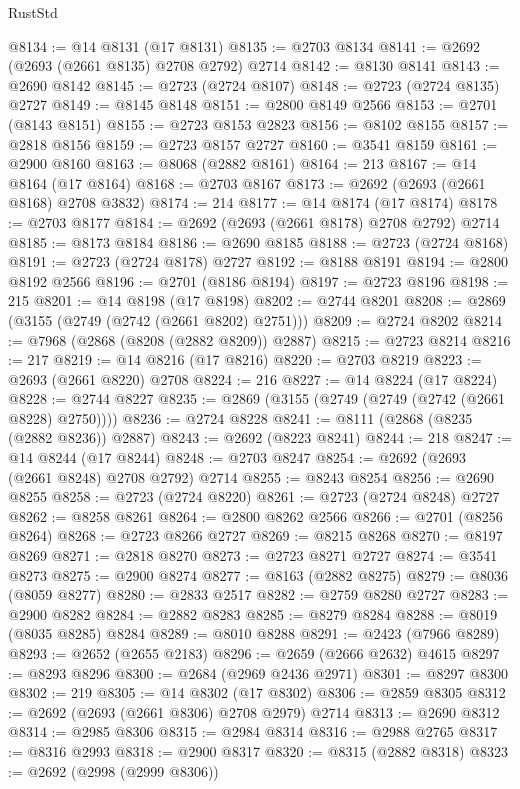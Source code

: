 \begin{lexlean}{RustStd}
\begin{coremodule}
@8134 := @14 @8131 (@17 @8131)
@8135 := @2703 @8134
@8141 := @2692 (@2693 (@2661 @8135) @2708 @2792) @2714
@8142 := @8130 @8141
@8143 := @2690 @8142
@8145 := @2723 (@2724 @8107)
@8148 := @2723 (@2724 @8135) @2727
@8149 := @8145 @8148
@8151 := @2800 @8149 @2566
@8153 := @2701 (@8143 @8151)
@8155 := @2723 @8153 @2823
@8156 := @8102 @8155
@8157 := @2818 @8156
@8159 := @2723 @8157 @2727
@8160 := @3541 @8159
@8161 := @2900 @8160
@8163 := @8068 (@2882 @8161)
@8164 := 213
@8167 := @14 @8164 (@17 @8164)
@8168 := @2703 @8167
@8173 := @2692 (@2693 (@2661 @8168) @2708 @3832)
@8174 := 214
@8177 := @14 @8174 (@17 @8174)
@8178 := @2703 @8177
@8184 := @2692 (@2693 (@2661 @8178) @2708 @2792) @2714
@8185 := @8173 @8184
@8186 := @2690 @8185
@8188 := @2723 (@2724 @8168)
@8191 := @2723 (@2724 @8178) @2727
@8192 := @8188 @8191
@8194 := @2800 @8192 @2566
@8196 := @2701 (@8186 @8194)
@8197 := @2723 @8196
@8198 := 215
@8201 := @14 @8198 (@17 @8198)
@8202 := @2744 @8201
@8208 := @2869 (@3155 (@2749 (@2742 (@2661 @8202) @2751)))
@8209 := @2724 @8202
@8214 := @7968 (@2868 (@8208 (@2882 @8209)) @2887)
@8215 := @2723 @8214
@8216 := 217
@8219 := @14 @8216 (@17 @8216)
@8220 := @2703 @8219
@8223 := @2693 (@2661 @8220) @2708
@8224 := 216
@8227 := @14 @8224 (@17 @8224)
@8228 := @2744 @8227
@8235 := @2869 (@3155 (@2749 (@2749 (@2742 (@2661 @8228) @2750))))
@8236 := @2724 @8228
@8241 := @8111 (@2868 (@8235 (@2882 @8236)) @2887)
@8243 := @2692 (@8223 @8241)
@8244 := 218
@8247 := @14 @8244 (@17 @8244)
@8248 := @2703 @8247
@8254 := @2692 (@2693 (@2661 @8248) @2708 @2792) @2714
@8255 := @8243 @8254
@8256 := @2690 @8255
@8258 := @2723 (@2724 @8220)
@8261 := @2723 (@2724 @8248) @2727
@8262 := @8258 @8261
@8264 := @2800 @8262 @2566
@8266 := @2701 (@8256 @8264)
@8268 := @2723 @8266 @2727
@8269 := @8215 @8268
@8270 := @8197 @8269
@8271 := @2818 @8270
@8273 := @2723 @8271 @2727
@8274 := @3541 @8273
@8275 := @2900 @8274
@8277 := @8163 (@2882 @8275)
@8279 := @8036 (@8059 @8277)
@8280 := @2833 @2517
@8282 := @2759 @8280 @2727
@8283 := @2900 @8282
@8284 := @2882 @8283
@8285 := @8279 @8284
@8288 := @8019 (@8035 @8285) @8284
@8289 := @8010 @8288
@8291 := @2423 (@7966 @8289)
@8293 := @2652 (@2655 @2183)
@8296 := @2659 (@2666 @2632) @4615
@8297 := @8293 @8296
@8300 := @2684 (@2969 @2436 @2971)
@8301 := @8297 @8300
@8302 := 219
@8305 := @14 @8302 (@17 @8302)
@8306 := @2859 @8305
@8312 := @2692 (@2693 (@2661 @8306) @2708 @2979) @2714
@8313 := @2690 @8312
@8314 := @2985 @8306
@8315 := @2984 @8314
@8316 := @2988 @2765
@8317 := @8316 @2993
@8318 := @2900 @8317
@8320 := @8315 (@2882 @8318)
@8323 := @2692 (@2998 (@2999 @8306))

\end{coremodule}
\end{lexlean}
